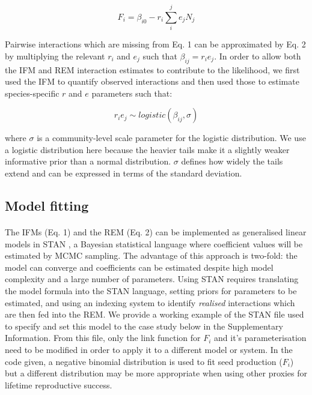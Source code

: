 \documentclass[a4,12pt]{article}
\begin{document}
        \begin{equation}
        F_{i} = \beta_{i0} - r_{i} \sum_{i}^{j} e_{j} N_{j}
        \label{rem1}
        \end{equation}
        
        Pairwise interactions which are missing from Eq. 1 can be approximated by Eq. 2 by multiplying the relevant $r_{i}$ and $e_{j}$ such that $\beta_{ij} = r_{i} e_{j}$. In order to allow both the IFM and REM interaction estimates to contribute to the likelihood, we first used the IFM to quantify observed interactions and then used those to estimate species-specific $r$ and $e$ parameters such that: 
    
        \begin{equation}
        r_i e_j \sim logistic \left ( \beta_{ij}, \sigma \right )
        \label{unrealised}
        \end{equation}
    
        where $\sigma$ is a community-level scale parameter for the logistic distribution. We use a logistic distribution here because the heavier tails make it a slightly weaker informative prior than a normal distribution. $\sigma$ defines how widely the tails extend and can be expressed in terms of the standard deviation. 

	\subsection{Model fitting}

        \paragraph{}        
        The IFMs (Eq. 1) and the REM (Eq. 2) can be implemented as generalised linear models in STAN \parencite{Carpenter2017}, a Bayesian statistical language where coefficient values will be estimated by MCMC sampling. The advantage of this approach is two-fold: the model can converge and coefficients can be estimated despite high model complexity and a large number of parameters. Using STAN requires translating the model formula into the STAN language, setting priors for parameters to be estimated, and using an indexing system to identify \textit{realised} interactions which are then fed into the REM. We provide a working example of the STAN file used to specify and set this model to the case study below in the Supplementary Information. From this file, only the link function for $F_i$ and it's parameterisation need to be modified in order to apply it to a different model or system. In the code given, a negative binomial distribution is used to fit seed production ($F_i$) but a different distribution may be more appropriate when using other proxies for lifetime reproductive success.   
\end{document}
